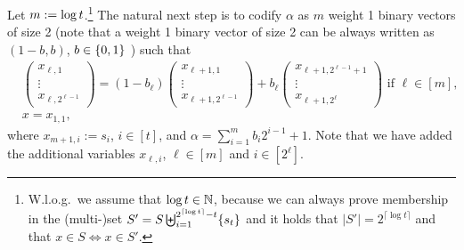 Let $m:=\log t$.\footnote{ W.l.o.g.~we assume that \(\log t \in\mathbb{N}\), because we can always prove membership in the (multi-)set \(S'=S\biguplus_{i=1}^{2^{\lceil \log t  \rceil}-t}\{s_{t} \}\) and it holds that $|S'|=2^{\lceil \log t \rceil}$ and that $x\in S \Longleftrightarrow x\in S'$.} The natural next step is to codify \(\alpha\) as \(m\) weight 1 binary vectors of size 2 (note that a weight 1 binary vector of size 2 can be always written as \((1-b,b)\), \(b\in\{0,1\}\) ) such that
\begin{align}
&\begin{pmatrix}
x_{\ell,1}\\\vdots\\x_{\ell,{2^{\ell-1}}}
\end{pmatrix}
=
(1-b_\ell)
\begin{pmatrix}
x_{\ell+1,1}\\\vdots\\x_{\ell+1,{2^{\ell-1}}}
\end{pmatrix}
+
b_\ell
\begin{pmatrix}
x_{\ell+1, 2^{\ell-1}+1}\\\vdots\\x_{\ell+1,2^{\ell}}
\end{pmatrix}
\text{ if } \ell \in[m],\label{eq-log-2}\\
&
x= x_{1,1}\label{eq-log-3},
\end{align}
where \(x_{m+1,i}:=s_i\), \(i\in[t]\), and \(\alpha=\sum_{i=1}^{m}b_i2^{i-1}+1\). Note that we have added the additional variables \(x_{\ell,i}\), \(\ell\in[m]\) and \(i\in[2^\ell]\).

